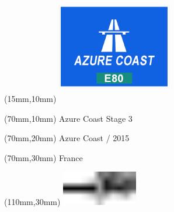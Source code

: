\null\newpage
\begin{textblock*}{50mm}(15mm,10mm)%
\includegraphics[width=50mm]{LG/AZO.png}
\end{textblock*}
\begin{textblock*}{130mm}(70mm,10mm)%
{\fontsize{20}{20}\selectfont Azure Coast Stage 3}\\
\end{textblock*}
\begin{textblock*}{120mm}(70mm,20mm)%
{\fontsize{16}{16}\selectfont Azure Coast / 2015}\\
\end{textblock*}
\begin{textblock*}{120mm}(70mm,30mm)%
{\fontsize{12}{12}\selectfont France}
\end{textblock*}
\begin{textblock*}{30mm}(110mm,30mm)%
\centering
\includegraphics[height=15mm]{icons/tofinish.pdf}
\end{textblock*}
